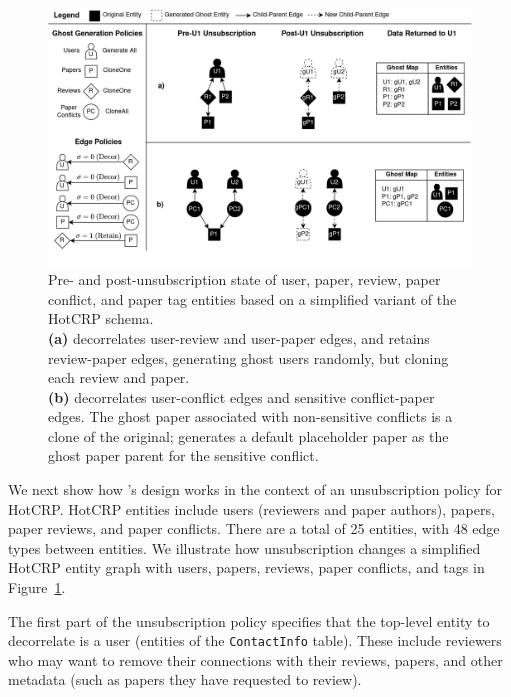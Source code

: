 \begin{figure}[ht!]
    \centering
    \includegraphics[width=\textwidth]{img/decor_hotcrp}

    \caption{Pre- and post-unsubscription state of user, paper, review, paper conflict, and paper
    tag entities based on a simplified variant of the HotCRP schema. \\ 
    \textbf{(a)} \sys decorrelates user-review and user-paper edges, and retains
    review-paper edges, generating ghost users randomly, but cloning each review and paper. \\
    \textbf{(b)} \sys decorrelates user-conflict edges and sensitive conflict-paper edges. The ghost
    paper associated with non-sensitive conflicts is a clone of the original; \sys generates a
    default placeholder paper as the ghost paper parent for the sensitive conflict.
    }
    \label{fig:hotcrp}
\end{figure}

We next show how \sys's design works in the context of an unsubscription policy for HotCRP. 
HotCRP entities include users (reviewers and paper authors), papers, paper reviews, and paper
conflicts. There are a total of 25 entities, with 48 edge types between entities.
We illustrate how unsubscription changes a simplified HotCRP entity graph with users, papers,
reviews, paper conflicts, and tags in Figure~\ref{fig:hotcrp}.

The first part of the unsubscription policy specifies that the top-level entity to decorrelate is a
user (entities of the \texttt{ContactInfo} table). These include reviewers who may want to remove
their connections with their reviews, papers, and other metadata (such as papers they have requested
to review).

